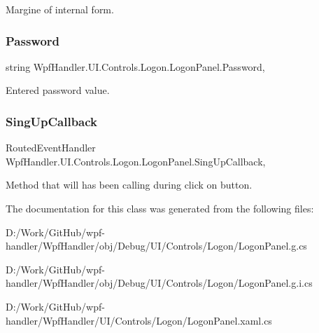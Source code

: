 Margine of internal form. 

\mbox{\label{class_wpf_handler_1_1_u_i_1_1_controls_1_1_logon_1_1_logon_panel_a2b5b8a76a045af6351be2ddaab3ebaf0}} 
\subsubsection{\texorpdfstring{Password}{Password}}
{\footnotesize\ttfamily string Wpf\+Handler.\+U\+I.\+Controls.\+Logon.\+Logon\+Panel.\+Password\hspace{0.3cm}{\ttfamily [get]}, {\ttfamily [set]}}



Entered password value. 

\mbox{\label{class_wpf_handler_1_1_u_i_1_1_controls_1_1_logon_1_1_logon_panel_a0f9d98ee4593b4159b475d04304f9c8c}} 
\subsubsection{\texorpdfstring{Sing\+Up\+Callback}{SingUpCallback}}
{\footnotesize\ttfamily Routed\+Event\+Handler Wpf\+Handler.\+U\+I.\+Controls.\+Logon.\+Logon\+Panel.\+Sing\+Up\+Callback\hspace{0.3cm}{\ttfamily [add]}, {\ttfamily [remove]}}



Method that will has been calling during click on button. 



The documentation for this class was generated from the following files\+:\begin{DoxyCompactItemize}
\item 
D\+:/\+Work/\+Git\+Hub/wpf-\/handler/\+Wpf\+Handler/obj/\+Debug/\+U\+I/\+Controls/\+Logon/Logon\+Panel.\+g.\+cs\item 
D\+:/\+Work/\+Git\+Hub/wpf-\/handler/\+Wpf\+Handler/obj/\+Debug/\+U\+I/\+Controls/\+Logon/Logon\+Panel.\+g.\+i.\+cs\item 
D\+:/\+Work/\+Git\+Hub/wpf-\/handler/\+Wpf\+Handler/\+U\+I/\+Controls/\+Logon/Logon\+Panel.\+xaml.\+cs\end{DoxyCompactItemize}
